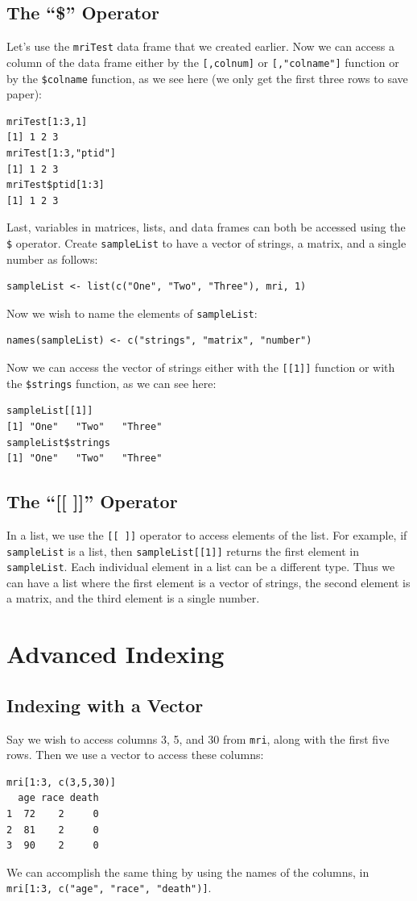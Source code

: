 \documentclass[11pt,letterpaper,fleqn]{report}
\begin{document}
\subsection{The ``\$'' Operator}
Let's use the \texttt{mriTest} data frame that we created earlier. Now we can access a column of the data frame either by the \texttt{[,colnum]} or \texttt{[,"colname"]} function or by the \texttt{\$colname} function, as we see here (we only get the first three rows to save paper):
\begin{verbatim}
mriTest[1:3,1]
[1] 1 2 3
mriTest[1:3,"ptid"]
[1] 1 2 3
mriTest$ptid[1:3]
[1] 1 2 3
\end{verbatim}
Last, variables in matrices, lists, and data frames can both be accessed using the \texttt{\$} operator. Create \texttt{sampleList} to have a vector of strings, a matrix, and a single number as follows:
\begin{verbatim}
sampleList <- list(c("One", "Two", "Three"), mri, 1)
\end{verbatim}
Now we wish to name the elements of \texttt{sampleList}:
\begin{verbatim}
names(sampleList) <- c("strings", "matrix", "number")
\end{verbatim}
Now we can access the vector of strings either with the \texttt{[[1]]} function or with the \texttt{\$strings} function, as we can see here:
\begin{verbatim}
sampleList[[1]]
[1] "One"   "Two"   "Three"
sampleList$strings
[1] "One"   "Two"   "Three"
\end{verbatim}
\subsection{The ``[[ ]]'' Operator}
In a list, we use the \texttt{[[ ]]} operator to access elements of the list. For example, if \texttt{sampleList} is a list, then \texttt{sampleList[[1]]} returns the first element in \texttt{sampleList}. Each individual element in a list can be a different type. Thus we can have a list where the first element is a vector of strings, the second element is a matrix, and the third element is a single number. 
\section{Advanced Indexing}
\subsection{Indexing with a Vector}
Say we wish to access columns 3, 5, and 30 from \texttt{mri}, along with the first five rows. Then we use a vector to access these columns:
\begin{verbatim}
mri[1:3, c(3,5,30)]
  age race death
1  72    2     0
2  81    2     0
3  90    2     0
\end{verbatim}
We can accomplish the same thing by using the names of the columns, in \texttt{mri[1:3, c("age", "race", "death")]}.
\end{document}

